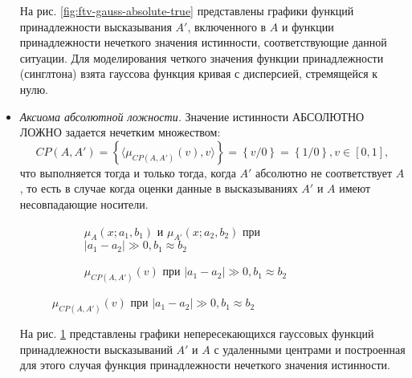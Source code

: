 \begin{itemize}
На рис. \ref{fig:ftv-gauss-absolute-true} представлены графики функций принадлежности высказывания $A'$, включенного в $A$ и функции принадлежности нечеткого значения истинности, соответствующие данной ситуации. Для моделирования четкого значения функции принадлежности (синглтона) взята гауссова функция кривая с дисперсией, стремящейся к нулю.

\item \textit{Аксиома абсолютной ложности.}  Значение истинности АБСОЛЮТНО ЛОЖНО задается нечетким множеством:
\begin{equation*}
CP(A, A') = \left\{\langle\mu_{CP(A, A')}(v), v\rangle\right\} = \left\{v/0\right\} = \left\{1/0\right\}, v \in [0, 1],
\end{equation*}
что выполняется тогда и только тогда, когда $A'$ абсолютно не соответствует $A$, то есть в случае когда оценки данные в высказываниях $A'$ и $A$ имеют несовпадающие носители.

\begin{figure}[ht]
	\newcommand{\aOne}{0.3}
	\newcommand{\bOne}{0.05}
	\newcommand{\aTwo}{0.67}
	\newcommand{\bTwo}{0.05}
	\begin{subfigure}[t]{0.5\textwidth}
		\caption{$\mu_A(x; a_1, b_1)$ и $\mu_{A'}(x; a_2, b_2)$ при $|a_1 - a_2| \gg 0, b_1 \approx b_2$}
	\end{subfigure}
	\begin{subfigure}[t]{0.5\textwidth}
		\caption{$\mu_{CP(A,A')}(v)$ при $|a_1 - a_2| \gg 0, b_1 \approx b_2$}
	\end{subfigure}
	\label{fig:ftv-gauss-absolute-false}
\end{figure}

На рис. \ref{fig:ftv-gauss-absolute-false} представлены графики непересекающихся гауссовых функций принадлежности высказываний $A'$ и $A$ с удаленными центрами и построенная для этого случая функция принадлежности нечеткого значения истинности.


\end{itemize}
